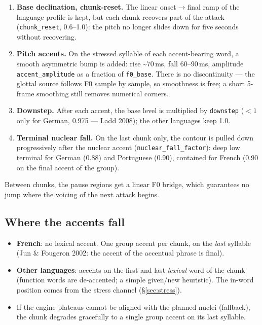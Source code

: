 \documentclass[11pt,a4paper]{article}
\begin{document}
\begin{enumerate}[itemsep=2pt]
\item \textbf{Base declination, chunk-reset.} The linear
  onset$\rightarrow$final ramp of the language profile is kept, but
  each chunk recovers part of the attack (\texttt{chunk\_reset},
  0.6--1.0): the pitch no longer slides down for five seconds
  without recovering.
\item \textbf{Pitch accents.} On the stressed syllable of each
  accent-bearing word, a smooth asymmetric bump is added: rise
  \textasciitilde 70\,ms, fall 60--90\,ms, amplitude
  \texttt{accent\_amplitude} as a fraction of \texttt{f0\_base}.
  There is no discontinuity --- the glottal source follows F0
  sample by sample, so smoothness is free; a short 5-frame
  smoothing still removes numerical corners.
\item \textbf{Downstep.} After each accent, the base level is
  multiplied by \texttt{downstep} ($<1$ only for German, 0.975 ---
  Ladd 2008); the other languages keep 1.0.
\item \textbf{Terminal nuclear fall.} On the last chunk only, the
  contour is pulled down progressively after the nuclear accent
  (\texttt{nuclear\_fall\_factor}): deep low terminal for German
  (0.88) and Portuguese (0.90), contained for French (0.90 on the
  final accent of the group).
\end{enumerate}

Between chunks, the pause regions get a linear F0 bridge, which
guarantees no jump where the voicing of the next attack begins.

\subsection{Where the accents fall}

\begin{itemize}[itemsep=2pt]
\item \textbf{French}: no lexical accent. One group accent per
  chunk, on the \emph{last} syllable (Jun \& Fougeron 2002: the
  accent of the accentual phrase is final).
\item \textbf{Other languages}: accents on the first and last
  \emph{lexical} word of the chunk (function words are
  de-accented; a simple given/new heuristic). The in-word position
  comes from the stress channel (\S\ref{sec:stress}).
\item If the engine plateaus cannot be aligned with the planned
  nuclei (fallback), the chunk degrades gracefully to a single
  group accent on its last syllable.
\end{itemize}
\end{document}
